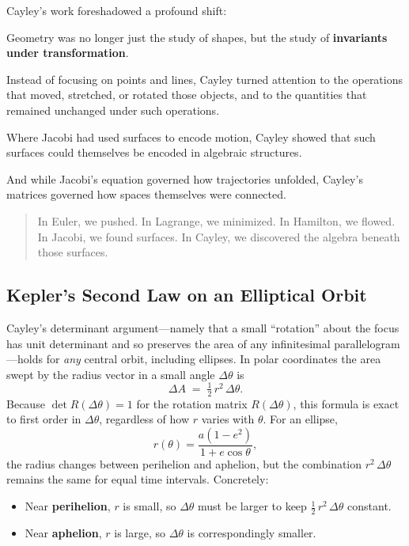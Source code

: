 Cayley’s work foreshadowed a profound shift:

Geometry was no longer just the study of shapes, but the study of \textbf{invariants under transformation}.

Instead of focusing on points and lines, Cayley turned attention to the operations that moved, stretched, 
or rotated those objects,  and to the quantities that remained unchanged under such operations.

Where Jacobi had used surfaces to encode motion,  
Cayley showed that such surfaces could themselves be encoded in algebraic structures.

And while Jacobi’s equation governed how trajectories unfolded,  
Cayley’s matrices governed how spaces themselves were connected.


\begin{quote}
In Euler, we pushed.  
In Lagrange, we minimized.  
In Hamilton, we flowed.  
In Jacobi, we found surfaces.  
In Cayley, we discovered the algebra beneath those surfaces.
\end{quote}





\subsection{Kepler’s Second Law on an Elliptical Orbit}

Cayley’s determinant argument—namely that a small “rotation” about the focus has unit determinant and so preserves the area of any infinitesimal parallelogram—holds for \emph{any} central orbit, including ellipses.  In polar coordinates the area swept by the radius vector in a small angle \(\Delta\theta\) is
\[
\Delta A \;=\;\tfrac12\,r^2\,\Delta\theta.
\]
Because \(\det R(\Delta\theta)=1\) for the rotation matrix \(R(\Delta\theta)\), this formula is exact to first order in \(\Delta\theta\), regardless of how \(r\) varies with \(\theta\).  For an ellipse,
\[
r(\theta)
=\frac{a(1-e^2)}{1+e\cos\theta},
\]
the radius changes between perihelion and aphelion, but the combination \(r^2\,\Delta\theta\) remains the same for equal time intervals.  Concretely:

\begin{itemize}
    \item Near \textbf{perihelion}, \(r\) is small, so \(\Delta\theta\) must be larger to keep \(\tfrac12\,r^2\,\Delta\theta\) constant.
    \item Near \textbf{aphelion}, \(r\) is large, so \(\Delta\theta\) is correspondingly smaller.
\end{itemize}

